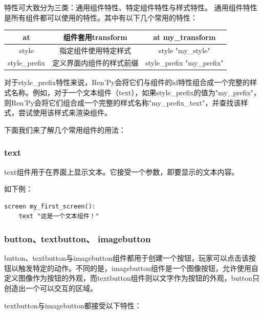 \documentclass[../../Main.tex]{subfiles}
\begin{document}
特性可大致分为三类：通用组件特性、特定组件特性与样式特性。
通用组件特性是所有组件都可以使用的特性。其中有以下几个常用的特性：
\begin{center}
    \tabletail{\hline}
    \tablelasttail{\hline}
    \begin{supertabular}{|c|c|c|}
        \hline
        at & 组件套用transform & at my\_transform\\
        \hline
        style & 指定组件使用特定样式 & style "my\_style"\\
        \hline
        style\_prefix & 定义界面内组件的样式前缀 & style\_prefix "my\_prefix"\\
        \hline
    \end{supertabular}
\end{center}

对于style\_prefix特性来说，Ren'Py会将它们与组件的id特性组合成一个完整的样式名称。例如，对于一个文本组件（text），如果style\_prefix的值为"my\_prefix"，则Ren'Py会将它们组合成一个完整的样式名称"my\_prefix\_text"，并查找该样式，尝试使用该样式来渲染组件。

下面我们来了解几个常用组件的用法：

\subsubsection{text}
text组件用于在界面上显示文本。它接受一个参数，即要显示的文本内容。

如下例：
\begin{lstlisting}
screen my_first_screen():
    text "这是一个文本组件！"
\end{lstlisting}


\subsubsection{button、textbutton、 imagebutton}
button、textbutton与imagebutton组件都用于创建一个按钮，玩家可以点击该按钮以触发特定的动作。不同的是，imagebutton组件是一个图像按钮，允许使用自定义图像作为按钮的外观，而textbutton组件则以文字作为按钮的外观，button只创造出一个可以交互的区域。

textbutton与imagebutton都接受以下特性：
\end{document}
